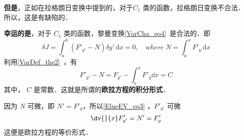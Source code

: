 \textbf{但是}，正如在拉格朗日变换中提到的，对于$C_1$ 类的函数，拉格朗日变换不合法．所以，这是有缺陷的．

\textbf{幸运的是}，对于 $C_1$ 类的函数，黎曼变换\autoref{VarCha_eq4}~是合法的．即
\begin{equation}
\delta J=\int_a^b \left(F'_{y'}-N \right) \delta y' \,\mathrm{d}{x}=0  ,\quad where \;N=\int_a^xF'_y \,\mathrm{d}{x} 
\end{equation}
利用\autoref{VarDef_the2}~，有
\begin{equation}\label{ElueEV_eq3}
F'_{y'}-N=F_{y'}-\int_a^xF'_y\dd x=C
\end{equation}
其中， $C$ 是常数．这就是所谓的\textbf{欧拉方程的积分形式}．

因为 $N$ 可微，即 $N'=F'_y$，所以\autoref{ElueEV_eq3} ，$F'_{y'}$ 可微
\begin{equation}
\dv{}{x}F'_{y'}=N'=F'_y
\end{equation}
这便是欧拉方程的等价形式．